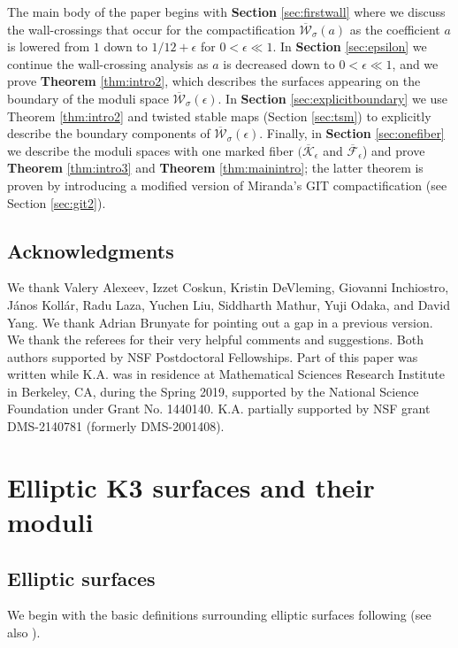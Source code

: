 \documentclass[11pt]{amsart}
\theoremstyle{definition}
\theoremstyle{remark}
\newcommand{\calW}{\mathcal W}
\newcommand{\ska}{\overline{\calW}_\sigma(a)}
\newcommand{\ke}{\overline{\mathcal{K}}_{\epsilon}}
\newcommand{\fe}{\overline{\mathcal{F}}_\epsilon}
\newcommand{\kepsilon}{\overline{\mathcal{W}}_\sigma(\epsilon)}
\newcommand{\km}{\fe}
\begin{document}
	The main body of the paper begins with \textbf{Section} \ref{sec:firstwall} where we discuss the wall-crossings that occur for the compactification $\ska$ as the coefficient $a$ is lowered from $1$ down to $1/12 + \epsilon$ for $0 < \epsilon \ll 1$.  In \textbf{Section} \ref{sec:epsilon} we continue the wall-crossing analysis as $a$ is decreased down to $0 < \epsilon \ll 1$, and we prove \textbf{Theorem} \ref{thm:intro2}, which describes the surfaces appearing on the boundary of the moduli space $\kepsilon$. In \textbf{Section} \ref{sec:explicitboundary} we use Theorem \ref{thm:intro2} and twisted stable maps (Section \ref{sec:tsm}) to explicitly describe the boundary components of $\kepsilon$. Finally, in \textbf{Section} \ref{sec:onefiber} we describe the moduli spaces with one marked fiber $(\ke$ and $\km$) and prove \textbf{Theorem} \ref{thm:intro3} and \textbf{Theorem} \ref{thm:mainintro}; the latter theorem is proven by introducing a modified version of Miranda's GIT compactification (see Section \ref{sec:git2}).  
	
	
	
	
	
	
	
	\subsection*{Acknowledgments} We thank Valery Alexeev, Izzet Coskun, Kristin DeVleming, Giovanni Inchiostro,  J\'anos Koll\'ar, Radu Laza, Yuchen Liu,  Siddharth Mathur, Yuji Odaka, and David Yang. We thank Adrian Brunyate for pointing out a gap in a previous version. We thank the referees for their very helpful comments and suggestions. Both authors supported by NSF Postdoctoral Fellowships.  Part of this paper was written while K.A. was in residence at Mathematical Sciences Research Institute in Berkeley, CA, during the Spring 2019, supported by the National Science Foundation under Grant No. 1440140. K.A. partially supported by NSF grant DMS-2140781 (formerly DMS-2001408). 
	
	\section{Elliptic K3 surfaces and their moduli} \label{sec:intromoduliK3}
	
	
	\subsection{Elliptic surfaces} We begin with the basic definitions surrounding elliptic surfaces following \cite{master} (see also \cite{mir3}).
	
\end{document}
